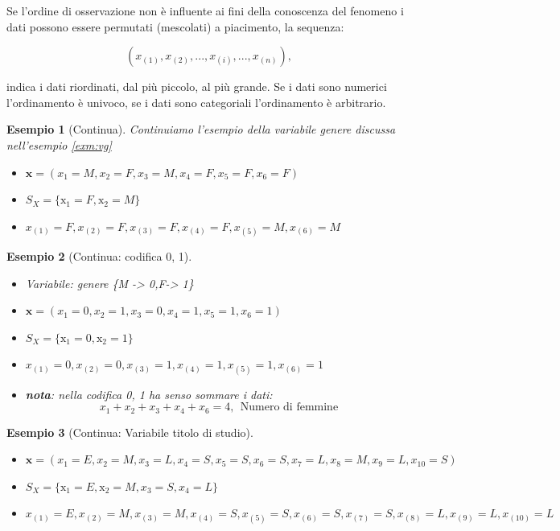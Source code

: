 \documentclass[
  11pt,
]{book}
\providecommand{\tightlist}{%
  \setlength{\itemsep}{0pt}\setlength{\parskip}{0pt}}
\theoremstyle{mytheoremstyle}
\theoremstyle{mydefstyle}
\newtheorem{example}{{Esempio}}[section]
\begin{document}
Se l'ordine di osservazione non è influente ai fini della conoscenza del fenomeno
i dati possono essere permutati (mescolati) a piacimento, la sequenza:

\[(x_{(1)},x_{(2)},...,x_{(i)},...,x_{(n)}),\]

indica i dati riordinati, dal più piccolo, al più grande. Se i dati sono numerici
l'ordinamento è univoco, se i dati sono categoriali l'ordinamento è arbitrario.

\begin{example}[Continua]

Continuiamo l'esempio della variabile genere discussa
nell'esempio \ref{exm:vg}

\begin{itemize}
\tightlist
\item
  \(\mathbf{x}=(x_1 = M, x_2 =F, x_3 =M, x_4=F,x_5=F,x_6=F)\)
\item
  \(S_X=\{\mathrm{x}_1 = F,\mathrm{x}_2 = M\}\)
\item
  \(x_{(1)}=F,x_{(2)}=F,x_{(3)}=F,x_{(4)}=F,x_{(5)}=M,x_{(6)}=M\)
\end{itemize}

\end{example}

\begin{example}[Continua: codifica 0, 1]

\(\phantom{.}\)

\begin{itemize}
\tightlist
\item
  Variabile: genere \{M -\textgreater{} 0,F-\textgreater{} 1\}
\item
  \(\mathbf{x}=(x_1 = 0, x_2 =1, x_3 =0, x_4=1,x_5=1,x_6=1)\)
\item
  \(S_X=\{\mathrm{x}_1 = 0,\mathrm{x}_2 = 1\}\)
\item
  \(x_{(1)}=0,x_{(2)}=0,x_{(3)}=1,x_{(4)}=1,x_{(5)}=1,x_{(6)}=1\)
\item
  \textbf{nota}: nella codifica 0, 1 ha senso sommare i dati:
  \[x_1+x_2+x_3+x_4+x_6=4,~~\text{Numero di femmine}\]
\end{itemize}

\end{example}

\begin{example}[Continua: Variabile titolo di studio]

\(\phantom{.}\)

\begin{itemize}
\tightlist
\item
  \(\mathbf{x}=(x_1 = E, x_2 =M, x_3 =L, x_4=S,x_5=S,x_6=S,
  x_7=L,x_8=M,x_9=L,x_{10}=S)\)
\item
  \(S_X=\{\mathrm{x}_1 = E,\mathrm{x}_2 = M, x_3=S, x_4=L\}\)
\item
  \(x_{(1)}=E,x_{(2)}=M,x_{(3)}=M,x_{(4)}=S,x_{(5)}=S,x_{(6)}=S,x_{(7)}=S,x_{(8)}=L,x_{(9)}=L,
  x_{(10)}=L\)
\end{itemize}

\end{example}
\end{document}
